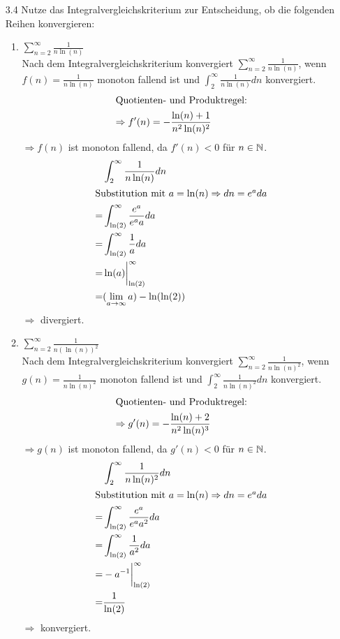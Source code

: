 \documentclass{HM}
\begin{document}
\begin{enumerate}
		\item[3.4] Nutze das Integralvergleichskriterium zur Entscheidung, ob die folgenden Reihen konvergieren:
		\begin{enumerate}
			\item $\sum\limits_{n=2}^\infty\frac{1}{n\ln(n)}$\\
			Nach dem Integralvergleichskriterium konvergiert $\sum\limits_{n=2}^\infty\frac{1}{n\ln(n)}$, wenn $f(n)=\frac{1}{n\ln(n)}$ monoton fallend ist und $\int_2^\infty\frac{1}{n\ln(n)}dn$ konvergiert.
			\begin{align*}
				\intertext{Quotienten- und Produktregel:}
				\Rightarrow f'(n)=-\frac{\ln(n)+1}{n^2\ln(n)^2}
			\end{align*}
			$\Rightarrow f(n)$ ist monoton fallend, da $f'(n)<0$ für $n\in\mathbb{N}$.
			\begin{align*}
				&\int_2^\infty\frac{1}{n\ln(n)}dn\\
				\intertext{Substitution mit $a=\ln(n)\Rightarrow dn=e^ada$}
				=&\int_{\ln(2)}^\infty\frac{e^a}{e^aa}da\\
				=&\int_{\ln(2)}^\infty\frac{1}{a}da\\
				=&\ln(a)\biggr|_{\ln(2)}^\infty\\
				=&(\lim_{a\to\infty}a)-\ln(\ln(2))
			\end{align*}
			$\Rightarrow$ divergiert.
			
			\item $\sum\limits_{n=2}^\infty\frac{1}{n(\ln(n))^2}$\\
			Nach dem Integralvergleichskriterium konvergiert $\sum\limits_{n=2}^\infty\frac{1}{n\ln(n)^2}$, wenn $g(n)=\frac{1}{n\ln(n)^2}$ monoton fallend ist und $\int_2^\infty\frac{1}{n\ln(n)^2}dn$ konvergiert.
			\begin{align*}
				\intertext{Quotienten- und Produktregel:}
				\Rightarrow g'(n)=-\frac{\ln(n)+2}{n^2\ln(n)^3}
			\end{align*}
			$\Rightarrow g(n)$ ist monoton fallend, da $g'(n)<0$ für $n\in\mathbb{N}$.
			\begin{align*}
				&\int_2^\infty\frac{1}{n\ln(n)^2}dn\\
				\intertext{Substitution mit $a=\ln(n)\Rightarrow dn=e^ada$}
				=&\int_{\ln(2)}^\infty\frac{e^a}{e^aa^2}da\\
				=&\int_{\ln(2)}^\infty\frac{1}{a^2}da\\
				=&-a^{-1}\biggr|_{\ln(2)}^\infty\\
				=&\frac{1}{\ln(2)}
			\end{align*}
			$\Rightarrow$ konvergiert.
		\end{enumerate}
		

\end{enumerate}
\end{document}
